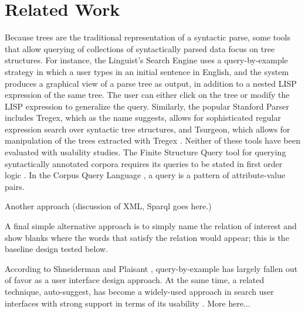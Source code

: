
\section{Related Work}

Because trees are the traditional representation of a syntactic parse,  some  tools that allow querying of  collections of syntactically parsed data focus on tree structures.   For instance, the Linguist's Search Engine \cite{resnik2005web} uses a query-by-example strategy in which a user types in an initial sentence in English, and the system produces a graphical view of a parse tree as output, in addition to a nested LISP expression of the same tree.  The user can either click on the tree or modify the LISP expression to generalize the query.    Similarly, the popular Stanford Parser includes Tregex, which as the name suggests,  allows for sophisticated regular expression search over syntactic tree structures, and Tsurgeon, which allows for manipulation of the trees extracted with Tregex \cite{levy2006tregex}.  Neither of these tools have been evaluated with usability studies.  The Finite Structure Query tool for querying syntactically annotated corpora requires its queries to be stated in first order logic \cite{kepser2003finite}. In the Corpus Query Language \cite{jakubicek2010fast}, a query is a pattern of attribute-value pairs.

Another approach (discussion of XML, Sparql goes here.)

A final simple alternative approach is to simply name the relation of interest and show blanks where the words that satisfy the relation would appear; this is the baseline design tested below.

According to Shneiderman and Plaisant \cite{shneiderman2010designing}, query-by-example has largely fallen out of favor as a user interface design approach.  At the same time, a related technique, auto-suggest, has become a widely-used approach in search user interfaces with strong support in terms of its usability \cite{hearst2009search}.  More here...